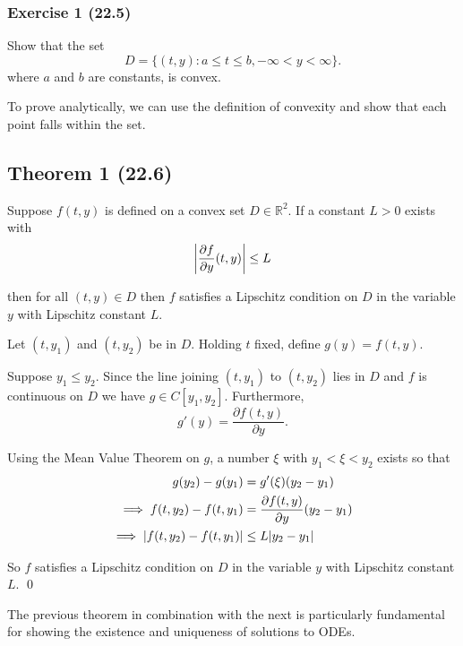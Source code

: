 \documentclass[12pt]{article}
\begin{document}
\subsubsection{Exercise 1 (22.5)}

Show that the set
\begin{equation*}
  D = \{(t,y):a\leq t\leq b, -\infty < y < \infty\}
.\end{equation*}
where $a$ and $b$ are constants, is convex.

To prove analytically, we can use the definition of convexity and show that each
point falls within the set.

\subsection{Theorem 1 (22.6)}

Suppose $f(t,y)$ is defined on a convex set $D\in \mathbb{R}^2$. If a constant
$L>0$ exists with
\begin{equation*}
  \abs{\frac{\partial f}{\partial y}(t,y)} \leq L
\end{equation*}

\noindent
then for all $(t,y) \in D$ then $f$ satisfies a Lipschitz condition on $D$ in
the variable $y$ with Lipschitz constant $L$.

\proof Let $(t, y_1)$ and $(t, y_2)$ be in $D$. Holding $t$ fixed, define 
$g(y) = f(t, y)$.

Suppose $y_1 \leq y_2$. Since the line joining $(t, y_1)$ to $(t, y_2)$ lies in
$D$ and $f$ is continuous on $D$ we have $g \in C[y_1, y_2]$. Furthermore,
\[
g'(y) = \frac{\partial f(t, y)}{\partial y}.
\]

Using the Mean Value Theorem on $g$, a number $\xi$ with $y_1 < \xi < y_2$ 
exists so that
\begin{align*}
  g(y_2) - g(y_1) &= g'(\xi)(y_2 - y_1) \\
  \implies f(t, y_2) - f(t, y_1) &= \frac{\partial f(t, y)}{\partial y}(y_2 - y_1) \\
  \implies \abs{f(t, y_2) - f(t, y_1)} &\leq L \abs{y_2 - y_1} \\
\end{align*}

So $f$ satisfies a Lipschitz condition on $D$ in the variable $y$ with Lipschitz
constant $L$. \qed

The previous theorem in combination with the next is particularly fundamental
for showing the existence and uniqueness of solutions to ODEs.
\end{document}
